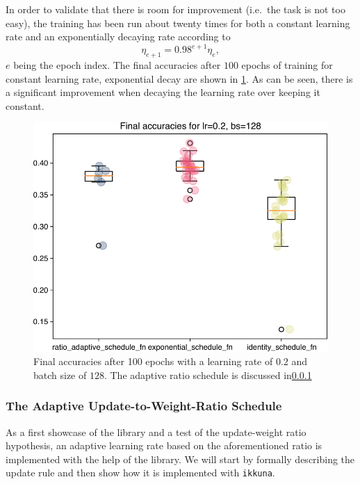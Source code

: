 In order to validate that there is room for improvement (i.e.~the task is not
too easy), the training has been
run about twenty times for both a constant learning rate and an exponentially
decaying rate according to
\begin{equation}
    \eta_{e+1}  = 0.98^{e+1} \eta_{e},
\end{equation}
$e$ being the epoch index.
The final accuracies after $100$ epochs of training for constant learning rate,
exponential decay are shown in \cref{fig:validation1}. As can be seen, there is
a significant improvement when decaying the learning rate over keeping it
constant.

\begin{figure}
    \centering
    \includegraphics[width=\linewidth]{gfx/diagrams/experiments/experiment_validation.pdf}
    \caption[Final accuracies after 100 epochs]{Final accuracies after 100
    epochs with a learning rate of $0.2$ and batch size of $128$. The adaptive
    ratio schedule is discussed in\cref{sec:ratio-schedule}}
    \label{fig:validation1}
\end{figure}

\subsubsection{The Adaptive Update-to-Weight-Ratio Schedule}\label{sec:ratio-schedule}%

As a first showcase of the library and a test of the update-weight ratio
hypothesis, an adaptive learning rate based on the aforementioned ratio is
implemented with the help of the library.  We will start by formally describing
the update rule and then show how it is implemented with \texttt{ikkuna}.


